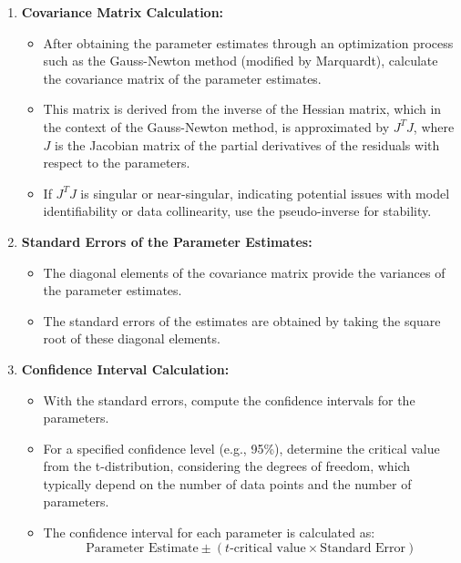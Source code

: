 \documentclass[12pt]{article} %
\begin{document}
\begin{enumerate}
    \item \textbf{Covariance Matrix Calculation:}
    \begin{itemize}
        \item After obtaining the parameter estimates through an optimization process such as the Gauss-Newton method (modified by Marquardt), calculate the covariance matrix of the parameter estimates.
        \item This matrix is derived from the inverse of the Hessian matrix, which in the context of the Gauss-Newton method, is approximated by $J^T J$, where $J$ is the Jacobian matrix of the partial derivatives of the residuals with respect to the parameters.
        \item If $J^T J$ is singular or near-singular, indicating potential issues with model identifiability or data collinearity, use the pseudo-inverse for stability.
    \end{itemize}
    \item \textbf{Standard Errors of the Parameter Estimates:}
    \begin{itemize}
        \item The diagonal elements of the covariance matrix provide the variances of the parameter estimates.
        \item The standard errors of the estimates are obtained by taking the square root of these diagonal elements.
    \end{itemize}
    \item \textbf{Confidence Interval Calculation:}
    \begin{itemize}
        \item With the standard errors, compute the confidence intervals for the parameters.
        \item For a specified confidence level (e.g., 95\%), determine the critical value from the t-distribution, considering the degrees of freedom, which typically depend on the number of data points and the number of parameters.
        \item The confidence interval for each parameter is calculated as:
        \[
        \text{Parameter Estimate} \pm (t\text{-critical value} \times \text{Standard Error})
        \]
    \end{itemize}
\end{enumerate}
\end{document}
